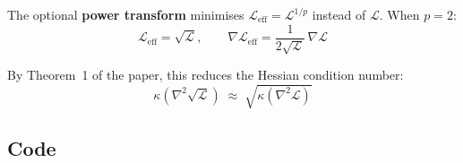 \documentclass[11pt,a4paper]{article}
\begin{document}
The optional \textbf{power transform} minimises
$\mathcal{L}_{\mathrm{eff}} = \mathcal{L}^{1/p}$ instead of
$\mathcal{L}$.  When $p = 2$:
\begin{equation}
  \mathcal{L}_{\mathrm{eff}} = \sqrt{\mathcal{L}},
  \qquad
  \nabla \mathcal{L}_{\mathrm{eff}}
  = \frac{1}{2\sqrt{\mathcal{L}}}\,\nabla\mathcal{L}
\label{eq:power}
\end{equation}

By Theorem~1 of the paper, this reduces the Hessian condition number:
\begin{equation}
  \kappa\!\left(\nabla^2\sqrt{\mathcal{L}}\right)
  \;\approx\; \sqrt{\kappa\!\left(\nabla^2\mathcal{L}\right)}
\label{eq:kappa}
\end{equation}

\subsection*{Code}
\end{document}
